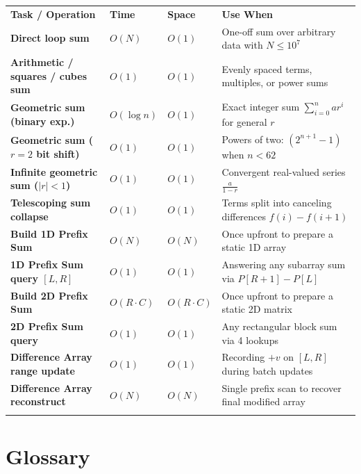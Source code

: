\documentclass[11pt,a4paper]{article}
\theoremstyle{definition}
\begin{document}
\begingroup\small{}
\begin{tabularx}{\textwidth}{>{\raggedright\arraybackslash\bfseries}p{4.8cm} >{\centering\arraybackslash}p{1.6cm} >{\centering\arraybackslash}p{1.6cm} >{\raggedright\arraybackslash}X}
\arrayrulecolor{primaryblue}\toprule[1.2pt]
\rowcolor{primaryblue!10}
\textcolor{primaryblue}{\textbf{Task / Operation}} & \textcolor{primaryblue}{\textbf{Time}} & \textcolor{primaryblue}{\textbf{Space}} & \textcolor{primaryblue}{\textbf{Use When}} \\
\arrayrulecolor{codeframe}\midrule[0.6pt]
Direct loop sum & $O(N)$ & $O(1)$ & One-off sum over arbitrary data with $N \le 10^7$ \\
Arithmetic / squares / cubes sum & $O(1)$ & $O(1)$ & Evenly spaced terms, multiples, or power sums \\
Geometric sum (binary exp.) & $O(\log n)$ & $O(1)$ & Exact integer sum $\sum_{i=0}^{n} ar^i$ for general $r$ \\
Geometric sum ($r = 2$ bit shift) & $O(1)$ & $O(1)$ & Powers of two: $(2^{n+1} - 1)$ when $n < 62$ \\
Infinite geometric sum ($|r| < 1$) & $O(1)$ & $O(1)$ & Convergent real-valued series $\frac{a}{1 - r}$ \\
Telescoping sum collapse & $O(1)$ & $O(1)$ & Terms split into canceling differences $f(i) - f(i+1)$ \\
Build 1D Prefix Sum & $O(N)$ & $O(N)$ & Once upfront to prepare a static 1D array \\
1D Prefix Sum query $[L, R]$ & $O(1)$ & $O(1)$ & Answering any subarray sum via $P[R+1] - P[L]$ \\
Build 2D Prefix Sum & $O(R \cdot C)$ & $O(R \cdot C)$ & Once upfront to prepare a static 2D matrix \\
2D Prefix Sum query & $O(1)$ & $O(1)$ & Any rectangular block sum via 4 lookups \\
Difference Array range update & $O(1)$ & $O(1)$ & Recording $+v$ on $[L, R]$ during batch updates \\
Difference Array reconstruct & $O(N)$ & $O(N)$ & Single prefix scan to recover final modified array \\
\arrayrulecolor{primaryblue}\bottomrule[1.2pt]
\end{tabularx}\endgroup

\section{Glossary}
\end{document}
